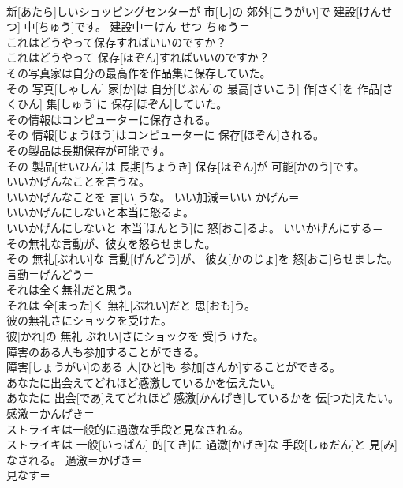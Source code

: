 \documentclass[8pt]{extreport}
\begin{document}
\begin{CJK}{UTF8}{min}
\\	新[あたら]しいショッピングセンターが 市[し]の 郊外[こうがい]で 建設[けんせつ] 中[ちゅう]です。	建設中＝けん せつ ちゅう＝ 
\\	これはどうやって保存すればいいのですか？	
\\	これはどうやって 保存[ほぞん]すればいいのですか？	
\\	その写真家は自分の最高作を作品集に保存していた。	
\\	その 写真[しゃしん] 家[か]は 自分[じぶん]の 最高[さいこう] 作[さく]を 作品[さくひん] 集[しゅう]に 保存[ほぞん]していた。	
\\	その情報はコンピューターに保存される。	
\\	その 情報[じょうほう]はコンピューターに 保存[ほぞん]される。	
\\	その製品は長期保存が可能です。	
\\	その 製品[せいひん]は 長期[ちょうき] 保存[ほぞん]が 可能[かのう]です。	
\\	いいかげんなことを言うな。	
\\	いいかげんなことを 言[い]うな。	いい加減＝いい かげん＝ 
\\	いいかげんにしないと本当に怒るよ。	
\\	いいかげんにしないと 本当[ほんとう]に 怒[おこ]るよ。	いいかげんにする＝ 
\\	その無礼な言動が、彼女を怒らせました。	
\\	その 無礼[ぶれい]な 言動[げんどう]が、 彼女[かのじょ]を 怒[おこ]らせました。	言動＝げんどう＝ 
\\	それは全く無礼だと思う。	
\\	それは 全[まった]く 無礼[ぶれい]だと 思[おも]う。	
\\	彼の無礼さにショックを受けた。	
\\	彼[かれ]の 無礼[ぶれい]さにショックを 受[う]けた。	
\\	障害のある人も参加することができる。	
\\	障害[しょうがい]のある 人[ひと]も 参加[さんか]することができる。	
\\	あなたに出会えてどれほど感激しているかを伝えたい。	
\\	あなたに 出会[であ]えてどれほど 感激[かんげき]しているかを 伝[つた]えたい。	感激＝かんげき＝ 
\\	ストライキは一般的に過激な手段と見なされる。	
\\	ストライキは 一般[いっぱん] 的[てき]に 過激[かげき]な 手段[しゅだん]と 見[み]なされる。	過激＝かげき＝ 
\\	見なす＝ 

\end{CJK}
\end{document}
